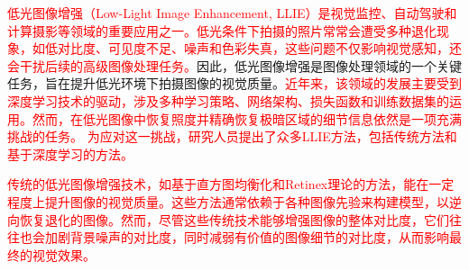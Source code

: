 \documentclass[a4paper]{ctexart}
\begin{document}
		\textcolor{red}{低光图像增强（Low-Light Image Enhancement, LLIE）是视觉监控、自动驾驶和计算摄影等领域的重要应用之一。低光条件下拍摄的照片常常会遭受多种退化现象，如低对比度、可见度不足、噪声和色彩失真，这些问题不仅影响视觉感知，还会干扰后续的高级图像处理任务。}因此，低光图像增强是图像处理领域的一个关键任务，旨在提升低光环境下拍摄图像的视觉质量。\textcolor{red}{近年来，该领域的发展主要受到深度学习技术的驱动，涉及多种学习策略、网络架构、损失函数和训练数据集的运用。然而，在低光图像中恢复照度并精确恢复极暗区域的细节信息依然是一项充满挑战的任务。}%
		\textcolor{red}{为应对这一挑战，研究人员提出了众多LLIE方法，包括传统方法和基于深度学习的方法。}
		
		
		\textcolor{red}{传统的低光图像增强技术，如基于直方图均衡化\cite{ji1994adaptive}和Retinex理论\cite{land1965, land1977retinex, jobson1997properties}的方法，能在一定程度上提升图像的视觉质量。这些方法通常依赖于各种图像先验来构建模型，以逆向恢复退化的图像。然而，尽管这些传统技术能够增强图像的整体对比度，它们往往也会加剧背景噪声的对比度，同时减弱有价值的图像细节的对比度，从而影响最终的视觉效果。}%
\end{document}
